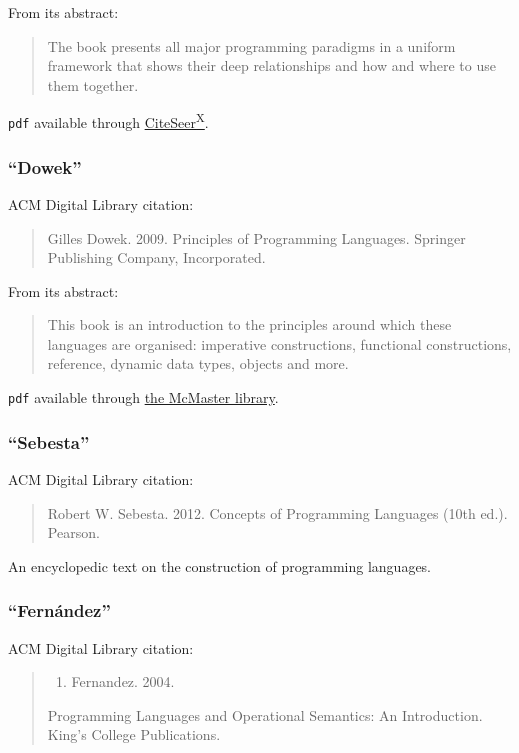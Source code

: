 \documentclass[11pt]{article}
\begin{document}
From its abstract:
\begin{quote}
The book presents all major programming paradigms in a uniform framework
that shows their deep relationships and how and where
to use them together.
\end{quote}

\texttt{pdf} available through
\href{http://citeseerx.ist.psu.edu/viewdoc/download?doi=10.1.1.102.7366\&rep=rep1\&type=pdf}{CiteSeer\textsuperscript{X}}.

\subsubsection{\textbf{“Dowek”}}
\label{sec:org778da23}
ACM Digital Library citation:
\begin{quote}
Gilles Dowek. 2009.
Principles of Programming Languages.
Springer Publishing Company, Incorporated.
\end{quote}

From its abstract:
\begin{quote}
This book is an introduction to the principles
around which these languages are organised:
imperative constructions, functional constructions,
reference, dynamic data types, objects and more.
\end{quote}

\texttt{pdf} available through
\href{https://discovery.mcmaster.ca/iii/encore/record/C\_\_Rb1593967}{the McMaster library}.

\subsubsection{\textbf{“Sebesta”}}
\label{sec:org2da8468}
ACM Digital Library citation:
\begin{quote}
Robert W. Sebesta. 2012.
Concepts of Programming Languages (10th ed.).
Pearson.
\end{quote}

An encyclopedic text on the construction of programming languages.

\subsubsection{\textbf{“Fernández”}}
\label{sec:org831cf7a}
ACM Digital Library citation:
\begin{quote}
\begin{enumerate}
\item Fernandez. 2004.
\end{enumerate}
Programming Languages and Operational Semantics: An Introduction.
King's College Publications.
\end{quote}
\end{document}
